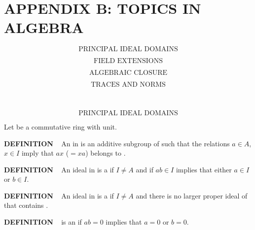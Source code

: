 \chapter{
APPENDIX B: TOPICS IN ALGEBRA}
\setlength\parindent{2em}
\setcounter{theoremn}{0}
\[
\text{PRINCIPAL IDEAL DOMAINS}
\]

\[
\text{FIELD EXTENSIONS}
\]

\[
\text{ALGEBRAIC CLOSURE}
\]

\[
\text{TRACES AND NORMS}
\]
\newpage

\ \indent 

\[
\text{PRINCIPAL IDEAL DOMAINS}
\]

Let \mA be a commutative ring with unit.

\vspace{0.2cm}

\begin{x}{\small\bf DEFINITION} \ %
An 
\mI in \mA is an additive subgroup of \mA such that the relations $a \in A$, $x \in I$ imply that 
$a x$ ($= x a$) belongs to \mI.
\end{x}

\vspace{0.1cm}


\begin{x}{\small\bf DEFINITION} \ %
An ideal \mI in \mA is a 
if $I \neq A$ and if $a b \in I$ implies that either $a \in I$ or $b \in I$.
\end{x}

\vspace{0.1cm}

\begin{x}{\small\bf DEFINITION} \ %
An ideal \mI in \mA is a 
if $I \neq A$ and there is no larger proper ideal of \mA that contains \mI.
\end{x}

\vspace{0.1cm}

\begin{x}{\small\bf DEFINITION} \ %
\mA is an
if $a b = 0$ implies that $a = 0$ or $b = 0$.
\end{x}

\vspace{0.1cm}

